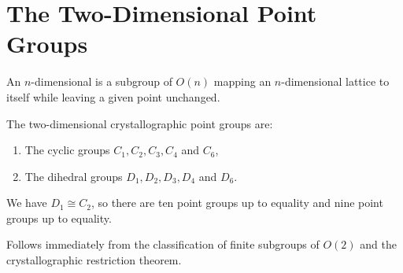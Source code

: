 \section{The Two-Dimensional Point Groups}
\begin{definition}
	An $n$-dimensional  is a subgroup of $O(n)$ mapping an $n$-dimensional lattice to itself while leaving a given point unchanged.
\end{definition}
\begin{importanttheorem}{}{}
	The two-dimensional crystallographic point groups are:
	\begin{enumerate}
		\item The cyclic groups $C_1, C_2, C_3, C_4$ and $C_6$,
		\item The dihedral groups $D_1, D_2, D_3, D_4$ and $D_6$.
	\end{enumerate}
	We have $D_1 \cong C_2$, so there are ten point groups up to equality and nine point groups up to equality.
\end{importanttheorem}
\begin{proofsketch}
	Follows immediately from the classification of finite subgroups of $O(2)$ and the crystallographic restriction theorem.
\end{proofsketch}
\iffalse
